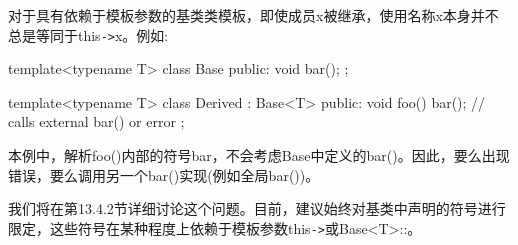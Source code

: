 对于具有依赖于模板参数的基类类模板，即使成员x被继承，使用名称x本身并不总是等同于this\texttt{->}x。例如:

\begin{cpp}
template<typename T>
class Base {
public:
	void bar();
};

template<typename T>
class Derived : Base<T> {
public:
	void foo() {
		bar(); // calls external bar() or error
	}
};
\end{cpp}

本例中，解析foo()内部的符号bar，不会考虑Base中定义的bar()。因此，要么出现错误，要么调用另一个bar()实现(例如全局bar())。

我们将在第13.4.2节详细讨论这个问题。目前，建议始终对基类中声明的符号进行限定，这些符号在某种程度上依赖于模板参数this\texttt{->}或Base<T>::。














































